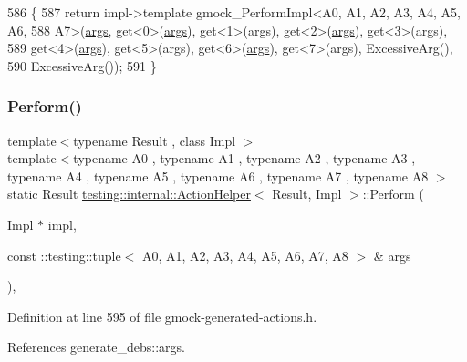 \begin{DoxyCode}
586                          \{
587     \textcolor{keywordflow}{return} impl->template gmock\_PerformImpl<A0, A1, A2, A3, A4, A5, A6,
588         A7>(\hyperlink{namespacegenerate__debs_a75f9143e38df82d83b2e8a6f99cae02c}{args}, get<0>(\hyperlink{namespacegenerate__debs_a75f9143e38df82d83b2e8a6f99cae02c}{args}), get<1>(args), get<2>(\hyperlink{namespacegenerate__debs_a75f9143e38df82d83b2e8a6f99cae02c}{args}), get<3>(args),
589         get<4>(\hyperlink{namespacegenerate__debs_a75f9143e38df82d83b2e8a6f99cae02c}{args}), get<5>(args), get<6>(\hyperlink{namespacegenerate__debs_a75f9143e38df82d83b2e8a6f99cae02c}{args}), get<7>(args), ExcessiveArg(),
590         ExcessiveArg());
591   \}
\end{DoxyCode}
\mbox{\label{classtesting_1_1internal_1_1ActionHelper_afcc265631df5d3a0f8955e9aa35c57f7}} 
\subsubsection{\texorpdfstring{Perform()}{Perform()}\hspace{0.1cm}{\footnotesize\ttfamily [10/11]}}
{\footnotesize\ttfamily template$<$typename Result , class Impl $>$ \\
template$<$typename A0 , typename A1 , typename A2 , typename A3 , typename A4 , typename A5 , typename A6 , typename A7 , typename A8 $>$ \\
static Result \hyperlink{classtesting_1_1internal_1_1ActionHelper}{testing\+::internal\+::\+Action\+Helper}$<$ Result, Impl $>$\+::Perform (\begin{DoxyParamCaption}\item[{Impl $\ast$}]{impl,  }\item[{const \+::testing\+::tuple$<$ A0, A1, A2, A3, A4, A5, A6, A7, A8 $>$ \&}]{args }\end{DoxyParamCaption})\hspace{0.3cm}{\ttfamily [inline]}, {\ttfamily [static]}}



Definition at line 595 of file gmock-\/generated-\/actions.\+h.



References generate\+\_\+debs\+::args.



